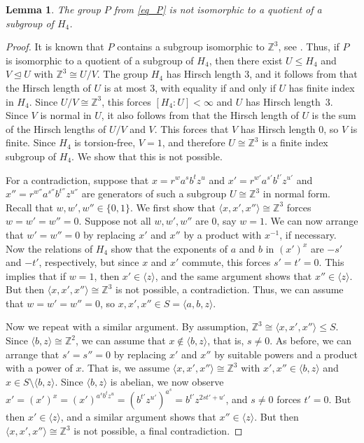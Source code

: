 \documentclass[11pt]{amsart}
\theoremstyle{mythm}
\newtheorem{lemma}[theorem]{Lemma}
\theoremstyle{mydef}
\theoremstyle{myrem}
\numberwithin{equation}{section}
\renewcommand{\leq}{\leqslant}
\newcommand{\Z}{\mathbb{Z}}
\begin{document}
\begin{lemma} 
The group $P$ from \eqref{eq_P} is not isomorphic to a quotient of a subgroup of $H_4$. 
\end{lemma}
\begin{proof}It is known that $P$ contains a subgroup isomorphic to $\Z^3$, see \cite[p.\ 447]{C}. Thus, if $P$ is isomorphic to a quotient of a subgroup of $H_4$, then there exist  $U\leq H_4$ and $V\unlhd U$ with $\Z^3\cong U/V$. The group  $H_4$ has Hirsch length $3$, and it follows from \cite[p.\ 16]{segal} that the Hirsch length of $U$ is at most $3$, with equality if and only if $U$ has finite index in $H_4$. Since $U/V\cong \Z^3$, this forces $[H_4:U]<\infty$ and $U$ has Hirsch length~$3$. Since $V$ is normal in $U$, it also follows from  \cite[p.\ 16]{segal} that the Hirsch length of $U$ is the sum of the Hirsch lengths of $U/V$ and $V$. This forces that $V$ has Hirsch length $0$, so $V$ is finite. Since $H_4$ is torsion-free, $V=1$, and therefore $U\cong \Z^3$ is a finite index subgroup of $H_4$. We show that this is not possible. 

  For a contradiction, suppose that $x=r^wa^sb^tz^u$ and $x'=r^{w'}a^{s'}b^{t'}z^{u'}$ and $x''=r^{w''}a^{s''}b^{t''}z^{u''}$ are generators of such a subgroup $U\cong \Z^3$ in normal form. Recall that $w,w',w''\in\{0,1\}$. We first show that $\langle x,x',x''\rangle\cong \Z^3$ forces $w=w'=w''=0$. Suppose not all $w,w',w''$ are $0$, say $w=1$. We can now arrange that $w'=w''=0$ by replacing $x'$ and $x''$ by a product with  $x^{-1}$, if necessary. Now the relations of $H_4$ show that the exponents of $a$ and $b$ in $(x')^x$ are ${-s'}$ and ${-t'}$, respectively, but since $x$ and $x'$ commute, this forces $s'=t'=0$. This implies that if $w=1$, then $x'\in \langle z\rangle$, and the same argument shows that $x''\in\langle z\rangle$. But then $\langle x,x',x''\rangle \cong \Z^3$ is not possible, a contradiction. Thus, we can assume that $w=w'=w''=0$, so $x,x',x''\in S=\langle a,b,z\rangle$.

  Now we repeat with a similar argument. By assumption, $\Z^3\cong \langle x,x',x''\rangle\leq S$. Since $\langle b,z\rangle \cong \Z^2$, we can assume that $x\notin \langle b,z\rangle$, that is, $s\ne 0$. As before, we can  arrange that $s'=s''=0$ by replacing $x'$ and $x''$ by suitable powers and a product with a power of $x$. That is, we assume $\langle x,x',x''\rangle\cong \Z^3$ with $x',x''\in\langle b,z\rangle$ and $x\in S\setminus\langle b,z\rangle$.  Since $\langle b,z\rangle$ is abelian, we now observe $x'=(x')^x=(x')^{a^sb^tz^u}=(b^{t'}z^{u'})^{a^s}=b^{t'}z^{2st'+u'}$, and $s\ne 0$ forces $t'=0$. But then $x'\in\langle z\rangle$, and a similar argument shows that $x''\in\langle z\rangle$. But then  $\langle x,x',x''\rangle\cong \Z^3$ is not possible, a final contradiction. 
\end{proof}   
\end{document}
